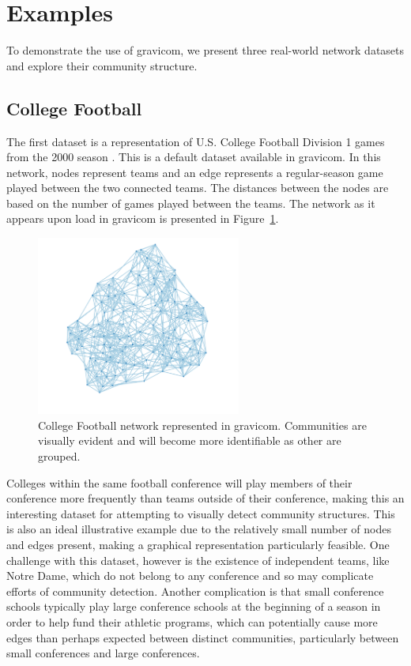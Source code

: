 \documentclass{article}\usepackage[]{graphicx}\usepackage[]{color}
\begin{document}
\section{Examples}

To demonstrate the use of gravicom, we present three real-world network datasets and explore their community structure.

\subsection{College Football} \label{sec:football}
The first dataset is a representation of U.S. College Football Division 1 games from the 2000 season \cite{gn-football}. This is a default dataset available in gravicom. In this network, nodes represent teams and an edge represents a regular-season game played between the two connected teams. The distances between the nodes are based on the number of games played between the teams. The network as it appears upon load in gravicom is presented in Figure~\ref{fig:football_1}. 

\begin{figure}[H]
\centering
\includegraphics[width=0.6\textwidth]{images/football_1.png}
\caption{\label{fig:football_1} College Football network represented in gravicom. Communities are visually evident and will become more identifiable as other are grouped.}
\end{figure}

Colleges within the same football conference will play members of their conference more frequently than teams outside of their conference, making this an interesting dataset for attempting to visually detect community structures. This is also an ideal illustrative example due to the relatively small number of nodes and edges present, making a graphical representation particularly feasible. One challenge with this dataset, however is the existence of independent teams, like Notre Dame, which do not belong to any conference and so may complicate efforts of community detection. Another complication is that small conference schools typically play large conference schools at the beginning of a season in order to help fund their athletic programs, which can potentially cause more edges than perhaps expected between distinct communities, particularly between small conferences and large conferences.
\end{document}

